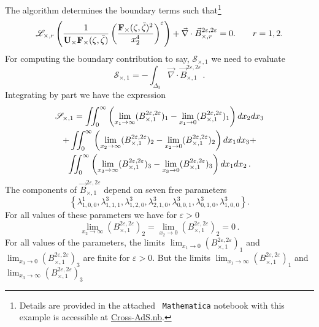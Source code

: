 \documentclass[a4paper,12pt]{article}
\numberwithin{equation}{section}
\numberwithin{figure}{section}
\begin{document}
 The algorithm determines the boundary terms 
 such that\footnote{Details are provided in the  attached {\tt
     Mathematica}  notebook with  this example is accessible at \href{Cross-AdS.nb}{Cross-AdS.nb}.}
 \begin{equation}
   \mathscr{L}_{\times,r}    \left( {1\over \textbf{U}_\times
    \textbf{F}_\times (\zeta,\bar\zeta)} \left(
    \textbf{F}_\times (\zeta,\bar\zeta)^{2}\over
    x_2^{4}\right)^\varepsilon \right)+ \vec\nabla\cdot\vec B^{2\varepsilon,2\varepsilon}_{\times,r}=0.
\qquad r=1,2.
\end{equation}
%
%
For computing the boundary contribution to say, $
\mathscr{S}_{\times,1}$ we need to evaluate
\begin{equation}
    \mathscr{S}_{\times,1}=- \int_{\Delta_3} \vec\nabla\cdot\vec
    B^{2\varepsilon,2\varepsilon}_{\times,1}\,.
\end{equation}
Integrating by part we have the expression
\begin{multline}
    \mathscr{S}_{\times,1}=\iint_0^\infty
\left(\lim_{x_1\to\infty}
  (B^{2\varepsilon,2\varepsilon}_{\times,1})_1-\lim_{x_1\to0}
  (B^{2\varepsilon,2\varepsilon}_{\times,1})_1\right)dx_2dx_3\cr
+\iint_0^\infty
\left(\lim_{x_2\to\infty}
  (B^{2\varepsilon,2\varepsilon}_{\times,1})_2-\lim_{x_2\to0}
  (B^{2\varepsilon,2\varepsilon}_{\times,1})_2\right)dx_1dx_3
+\cr\iint_0^\infty
\left(\lim_{x_3\to\infty}
  (B^{2\varepsilon,2\varepsilon}_{\times,1})_3-\lim_{x_3\to0}
  (B^{2\varepsilon,2\varepsilon}_{\times,1})_3\right)dx_1dx_2\,.
\end{multline}
%
The components of $\vec B^{2\varepsilon,2\varepsilon}_{\times,1}$
depend on seven free parameters
\begin{equation}
  \label{e:varBcross}
  \left\{\lambda^1_{1,0,0},\lambda^3_{1,1,1},\lambda^3_{1,2,0},\lambda^3_{2,1,0},\lambda^3_{0,0,1},\lambda^3_{0,1,0},\lambda^3_{1,0,0}\right\}.
\end{equation}
For all values of these parameters we have for $\varepsilon>0$
\begin{equation}
    \lim_{x_2\to\infty}
  (B^{2\varepsilon,2\varepsilon}_{\times,1})_2=\lim_{x_2\to0}
  (B^{2\varepsilon,2\varepsilon}_{\times,1})_2=0\,.
\end{equation}
%
For all values of the parameters, the limits 
$\lim_{x_1\to0}(B^{2\varepsilon,2\varepsilon}_{\times,1})_1$ and $\lim_{x_3\to0}(B^{2\varepsilon,2\varepsilon}_{\times,1})_3$ 
are finite for $\varepsilon>0$.
But the limits $\lim_{x_1\to\infty}(B^{2\varepsilon,2\varepsilon}_{\times,1})_1$ and $\lim_{x_3\to\infty}(B^{2\varepsilon,2\varepsilon}_{\times,1})_3$ 
\end{document}

